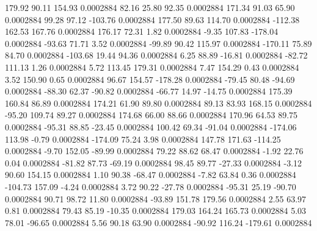       179.92       90.11      154.93     0.0002884
       82.16       25.80       92.35     0.0002884
      171.34       91.03       65.90     0.0002884
       99.28       97.12     -103.76     0.0002884
      177.50       89.63      114.70     0.0002884
     -112.38      162.53      167.76     0.0002884
      176.17       72.31        1.82     0.0002884
       -9.35      107.83     -178.04     0.0002884
      -93.63       71.71        3.52     0.0002884
      -99.89       90.42      115.97     0.0002884
     -170.11       75.89       84.70     0.0002884
     -103.68       19.44       94.36     0.0002884
        6.25       88.89      -16.81     0.0002884
      -82.72      111.13        1.26     0.0002884
        5.72      113.45      179.31     0.0002884
        7.47      154.29        0.43     0.0002884
        3.52      150.90        0.65     0.0002884
       96.67      154.57     -178.28     0.0002884
      -79.45       80.48      -94.69     0.0002884
      -88.30       62.37      -90.82     0.0002884
      -66.77       14.97      -14.75     0.0002884
      175.39      160.84       86.89     0.0002884
      174.21       61.90       89.80     0.0002884
       89.13       83.93      168.15     0.0002884
      -95.20      109.74       89.27     0.0002884
      174.68       66.00       88.66     0.0002884
      170.96       64.53       89.75     0.0002884
      -95.31       88.85      -23.45     0.0002884
      100.42       69.34      -91.04     0.0002884
     -174.06      113.98       -0.79     0.0002884
     -174.09       75.24        3.98     0.0002884
      147.78      171.63     -114.25     0.0002884
       -9.70      152.05      -89.99     0.0002884
       79.22       88.62       68.47     0.0002884
       -1.92       22.76        0.04     0.0002884
      -81.82       87.73      -69.19     0.0002884
       98.45       89.77      -27.33     0.0002884
       -3.12       90.60      154.15     0.0002884
        1.10       90.38      -68.47     0.0002884
       -7.82       63.84        0.36     0.0002884
     -104.73      157.09       -4.24     0.0002884
        3.72       90.22      -27.78     0.0002884
      -95.31       25.19      -90.70     0.0002884
       90.71       98.72       11.80     0.0002884
      -93.89      151.78      179.56     0.0002884
        2.55       63.97        0.81     0.0002884
       79.43       85.19      -10.35     0.0002884
      179.03      164.24      165.73     0.0002884
        5.03       78.01      -96.65     0.0002884
        5.56       90.18       63.90     0.0002884
      -90.92      116.24     -179.61     0.0002884
